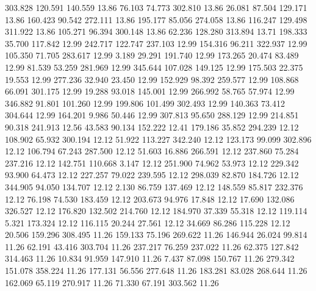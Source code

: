  303.828  120.591  140.559        13.86
  76.103   74.773  302.810        13.86
  26.081   87.504  129.171        13.86
 160.423   90.542  272.111        13.86
 195.177   85.056  274.058        13.86
 116.247  129.498  311.922        13.86
 105.271   96.394  300.148        13.86
  62.236  128.280  313.894        13.71
 198.333   35.700  117.842        12.99
 242.717  122.747  237.103        12.99
 154.316   96.211  322.937        12.99
 105.350   71.705  283.617        12.99
   3.189   29.291  191.740        12.99
 173.265   20.474   83.489        12.99
  81.539   53.259  281.969        12.99
 345.644  107.028  149.125        12.99
 175.503   22.375   19.553        12.99
 277.236   32.940   23.450        12.99
 152.929   98.392  259.577        12.99
 108.868   66.091  301.175        12.99
  19.288   93.018  145.001        12.99
 266.992   58.765   57.974        12.99
 346.882   91.801  101.260        12.99
 199.806  101.499  302.493        12.99
 140.363   73.412  304.644        12.99
 164.201    9.986   50.446        12.99
 307.813   95.650  288.129        12.99
 214.851   90.318  241.913        12.56
  43.583   90.134  152.222        12.41
 179.186   35.852  294.239        12.12
 108.902   65.932  300.194        12.12
  51.922  113.227  342.240        12.12
 123.173   99.099  302.896        12.12
 106.794   67.243  287.500        12.12
  51.603   16.886  266.591        12.12
 237.860   75.284  237.216        12.12
 142.751  110.668    3.147        12.12
 251.900   74.962   53.973        12.12
 229.342   93.900   64.473        12.12
 227.257   79.022  239.595        12.12
 298.039   82.870  184.726        12.12
 344.905   94.050  134.707        12.12
   2.130   86.759  137.469        12.12
 148.559   85.817  232.376        12.12
  76.198   74.530  183.459        12.12
 203.673   94.976   17.848        12.12
  17.690  132.086  326.527        12.12
 176.820  132.502  214.760        12.12
 184.970   37.339   55.318        12.12
 119.114    5.321  173.324        12.12
 116.115   20.244   27.561        12.12
  34.669   86.286  115.228        12.12
  20.506  159.296  308.495        11.26
 159.133   75.196  269.622        11.26
 146.944   26.024   99.814        11.26
  62.191   43.416  303.704        11.26
 237.217   76.259  237.022        11.26
  62.375  127.842  314.463        11.26
  10.834   91.959  147.910        11.26
   7.437   87.098  150.767        11.26
 279.342  151.078  358.224        11.26
 177.131   56.556  277.648        11.26
 183.281   83.028  268.644        11.26
 162.069   65.119  270.917        11.26
  71.330   67.191  303.562        11.26
